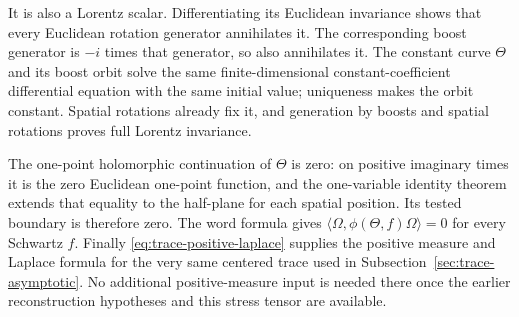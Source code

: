 It is also a Lorentz scalar. Differentiating its Euclidean invariance shows
that every Euclidean rotation generator annihilates it. The corresponding
boost generator is $-i$ times that generator, so also annihilates it. The
constant curve $\Theta$ and its boost orbit solve the same finite-dimensional
constant-coefficient differential equation with the same initial value;
uniqueness makes the orbit constant. Spatial rotations already fix it,
and generation by boosts and spatial rotations proves full Lorentz
invariance.

The one-point holomorphic continuation of $\Theta$ is zero: on positive
imaginary times it is the zero Euclidean one-point function, and the
one-variable identity theorem extends that equality to the half-plane
for each spatial position. Its tested boundary is therefore zero. The
word formula gives
$\langle\Omega,\phi(\Theta,f)\Omega\rangle=0$ for every Schwartz $f$.
Finally \eqref{eq:trace-positive-laplace} supplies the positive measure
and Laplace formula for the very same centered trace used in
Subsection~\ref{sec:trace-asymptotic}. No additional positive-measure input
is needed there once the earlier reconstruction hypotheses and this
stress tensor are available.
